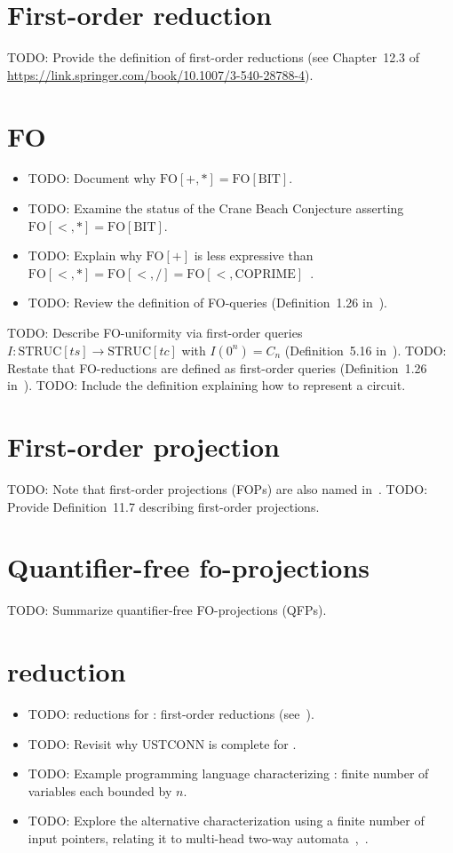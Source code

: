\section{First-order reduction}
TODO: Provide the definition of first-order reductions (see Chapter~12.3 of \url{https://link.springer.com/book/10.1007/3-540-28788-4}).

\section{FO}
\begin{itemize}
\item TODO: Document why $\text{FO}[+, *] = \text{FO}[\mathrm{BIT}]$.
\item TODO: Examine the status of the Crane Beach Conjecture asserting $\text{FO}[<, *] = \text{FO}[\mathrm{BIT}]$.
\item TODO: Explain why $\text{FO}[+]$ is less expressive than $\text{FO}[<, *] = \text{FO}[<, /] = \text{FO}[<, \mathrm{COPRIME}]$~\cite{10.1002/malq.200310041}.
\item TODO: Review the definition of FO-queries (Definition~1.26 in~\cite{Immerman1999-IMMDC}).
\end{itemize}
TODO: Describe FO-uniformity via first-order queries $I : \mathrm{STRUC}[ts] \rightarrow \mathrm{STRUC}[tc]$ with $I(0^n) = C_n$ (Definition~5.16 in~\cite{Immerman1999-IMMDC}).
TODO: Restate that FO-reductions are defined as first-order queries (Definition~1.26 in~\cite{Immerman1999-IMMDC}).
TODO: Include the definition explaining how to represent a circuit.

\section{First-order projection}
TODO: Note that first-order projections (FOPs) are also named in~\cite{Immerman1999-IMMDC}.
TODO: Provide Definition~11.7 describing first-order projections.
\section{Quantifier-free fo-projections}
TODO: Summarize quantifier-free FO-projections (QFPs).

\section{ reduction}
\begin{itemize}
\item TODO: reductions for : first-order reductions (see~\cite[Section~5.1]{Immerman1999-IMMDC}).
\item TODO: Revisit why USTCONN is complete for .
\item TODO: Example programming language characterizing : finite number of variables each bounded by $n$.
\item TODO: Explore the alternative characterization using a finite number of input pointers, relating it to multi-head two-way automata~\cite{423885},~\cite{10.1007/BF00289513}.
\end{itemize}

